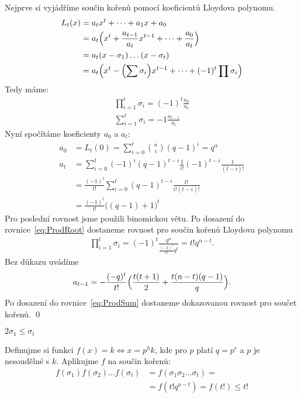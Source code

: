 \dk Nejprve si vyjádříme součin kořenů pomocí koeficientů Lloydova polynomu.
\begin{align*}
L_t(x) &= a_t x^t + \dots + a_1x + a_0 \\
&= a_t \Bigl(x^t + \frac{a_{t-1}}{a_t}x^{t-1} + \dots + \frac{a_0}{a_t}\Bigr) \\
&= a_t (x - \sigma_1)\dots(x - \sigma_t) \\
&= a_t\Bigl(x^t - \Bigl(\sum \sigma_i\Bigr)x^{t-1} + \dots + (-1)^t \prod \sigma_i\Bigr)
\end{align*}
Tedy máme:
\begin{align}
\prod\limits_{i = 1}^{t} \sigma_i = (-1)^t \frac{a_0}{a_t} \label{eq:ProdRoot} \\
\sum\limits_{i = 1}^{t} \sigma_i = -1 \frac{a_{t-1}}{a_t} \label{eq:ProdSum}
\end{align}
Nyní spočítáme koeficienty $a_0$ a $a_t$:
\begin{align*}
a_0 &= L_t(0) = \sum\limits_{i = 0}^{t} {n \choose i}(q - 1)^i = q^\alpha \\
a_t &= \sum\limits_{i = 0}^{t} (-1)^i (q - 1)^{t - i} \frac{1}{i!}(-1)^{t-i} \frac{1}{(t-i)!} \\
&= \frac{(-1)^t}{t!}\sum\limits_{i = 0}^{t}(q-1)^{t-i} \frac{t!}{i!(t-i)!} \\
&= \frac{(-1)^t}{t!}\bigl((q - 1) + 1\bigr)^t
\end{align*}
Pro poslední rovnost jsme použili binomickou větu. Po dosazení do rovnice~\ref{eq:ProdRoot} dostaneme rovnost pro součin kořenů Lloydova polynomu
\begin{align*}
\prod\limits_{i = 1}^{t} \sigma_i = (-1)^t \frac{q^\alpha}{\frac{(-1)^t}{t!}q^t} = t!q^{\alpha-t}.
\end{align*}
Bez důkazu uvádíme
\begin{align*}
a_{t-1} = - \frac{(-q)^t}{t!}\Bigl(\frac{t(t+1)}{2} + \frac{t(n-t)(q - 1)}{q}\Bigr).
\end{align*}
Po dosazení do rovnice~\ref{eq:ProdSum} dostaneme dokazovanou rovnost pro součet kořenů.
\qed

\lm $2 \sigma_1 \leq \sigma_t$

\dk Definujme si funkci $f(x) = k \Leftrightarrow x = p^hk$, kde pro $p$ platí $q = p^r$ a $p$ je nesoudělné s $k$. Aplikujme $f$ na součin kořenů:
\begin{align*}
f(\sigma_1)f(\sigma_2) \dots f(\sigma_t) &= f(\sigma_1\sigma_2 \dots \sigma_t) =\\
&= f(t!q^{a-t}) = f(t!) \leq t!
\end{align*}


